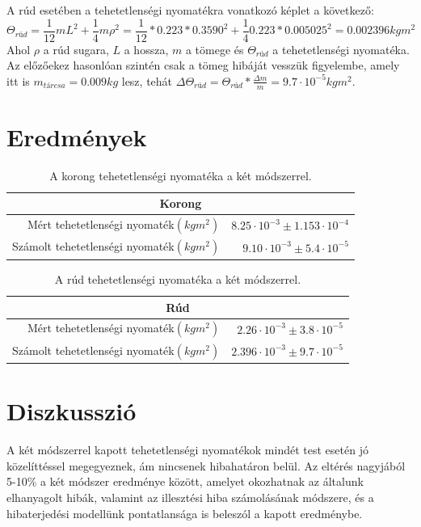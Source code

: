 \documentclass[10pt,pdftex]{report}
\begin{document}
A rúd esetében a tehetetlenségi nyomatékra vonatkozó képlet a következő:
\begin{equation*}
    \Theta_{rúd}=\frac{1}{12}mL^2+\frac{1}{4}m\rho^2=\frac{1}{12}*0.223*0.3590^2+\frac{1}{4}0.223*0.005025^2=0.002396kgm^2
\end{equation*}
Ahol $\rho$ a rúd sugara, $L$ a hossza, $m$ a tömege és $\Theta_{rúd}$ a tehetetlenségi nyomatéka.
Az előzőekez hasonlóan szintén csak a tömeg hibáját vesszük figyelembe, amely itt is $m_{tárcsa}=0.009kg$ lesz, tehát $\Delta \Theta_{rúd}=\Theta_{rúd}*\frac{\Delta m}{m}=9.7\cdot 10^{-5}kgm^2$.
\section*{Eredmények}
\begin{table}[H]
    \centering
    \begin{tabular}{|r|r|}
        \hline
        \multicolumn{2}{|c|}{Korong} \\
        \hline
        Mért tehetetlenségi nyomaték$(kgm^2)$ & $8.25\cdot 10^{-3}\pm{1.153\cdot 10^{-4}}$ \\
        \hline
        Számolt tehetetlenségi nyomaték$(kgm^2)$ & $9.10\cdot 10^{-3}\pm 5.4\cdot 10^{-5}$ \\
        \hline
    \end{tabular}
    \caption{A korong tehetetlenségi nyomatéka a két módszerrel.}
\end{table}
\begin{table}[H]
    \centering
    \begin{tabular}{|r|r|}
        \hline
        \multicolumn{2}{|c|}{Rúd} \\
        \hline
        Mért tehetetlenségi nyomaték$(kgm^2)$ & $2.26\cdot 10^{-3}\pm3.8\cdot 10^{-5}$ \\
        \hline
        Számolt tehetetlenségi nyomaték$(kgm^2)$ & $2.396\cdot 10^{-3}\pm9.7\cdot 10^{-5} $ \\
        \hline
    \end{tabular}
    \caption{A rúd tehetetlenségi nyomatéka a két módszerrel.}
\end{table}
\section*{Diszkusszió}
A két módszerrel kapott tehetetlenségi nyomatékok mindét test esetén jó közelíttéssel megegyeznek, ám nincsenek hibahatáron belül. Az eltérés nagyjából 5-10\% a két módszer eredménye között, amelyet okozhatnak az általunk elhanyagolt hibák, valamint az illesztési hiba számolásának módszere, és a hibaterjedési modellünk pontatlansága is beleszól a kapott eredménybe.
\end{document}
